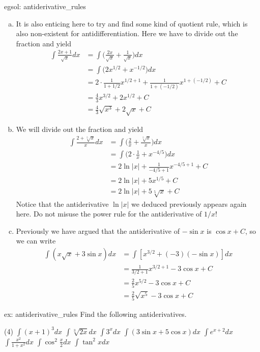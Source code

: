 \begin{egsol}[]{egsol: antiderivative_rules}
\begin{enumerate}[a)]
        \item It is also enticing here to try and find some kind of quotient rule, which is also non-existent for antidifferentiation.  Here we have to divide out the fraction and yield
        \begin{align*}
            \int \frac{2x + 1}{\sqrt{x}} dx &= \int \Big(\frac{2x}{\sqrt{x}} + \frac{1}{\sqrt{x}}\Big) dx\\
            &= \int \Big(2x^{1/2} + x^{-1/2}\Big) dx\\
            &= 2\cdot\frac{1}{1+1/2}x^{1/2+1} + \frac{1}{1+(-1/2)}x^{1+(-1/2)} + C\\
            &= \frac{4}{3}x^{3/2} + 2x^{1/2} + C\\
            &= \frac{4}{3}\sqrt{x^3} + 2\sqrt{x} + C
        \end{align*}
        \item We will divide out the fraction and yield
        \begin{align*}
            \int \frac{2+\sqrt[5]{x}}{x} dx &= \int \Big(\frac{2}{x} + \frac{\sqrt[5]{x}}{x}\Big) dx\\
            &= \int \Big(2 \cdot \frac{1}{x} + x^{-4/5}\Big) dx\\
            &= 2 \ln |x| + \frac{1}{-4/5 + 1} x^{-4/5 + 1} + C\\
            &= 2 \ln |x| + 5x^{1/5} + C\\
            &= 2 \ln |x| + 5\sqrt[5]{x} + C
        \end{align*}
        Notice that the antiderivative $\ln |x|$ we deduced previously appears again here.  Do not misuse the power rule for the antiderivative of $1/x$!
        \item Previously we have argued that the antiderivative of $-\sin x$ is $\cos x + C$, so we can write
        \begin{align*}
            \int (x\sqrt{x} + 3\sin x) dx &= \int [x^{3/2}+ (-3) (-\sin x)]dx\\
            &= \frac{1}{3/2+1} x^{3/2+1} - 3 \cos x + C\\
            &= \frac{2}{5}x^{5/2} - 3 \cos x + C\\
            &= \frac{2}{5}\sqrt{x^5} - 3 \cos x + C
        \end{align*}
    \end{enumerate}
\end{egsol}

\newpage
\begin{ex}[]{ex: antiderivative_rules}
    Find the following antiderivatives.
    \begin{tasks}(4)
        \task $\int (x+1)^3 dx$
        \task $\int \sqrt[3]{2x} dx$
        \task $\int 3^x dx$
        \task $\int (3\sin x + 5\cos x) dx$
        \task $\int e^{x+2} dx$
        \task $\int \frac{x^2}{1+x^2} dx$
        \task $\int \cos^2 \frac{x}{2} dx$ 
        \task $\int \tan^2 x dx$
    \end{tasks}
\end{ex}

